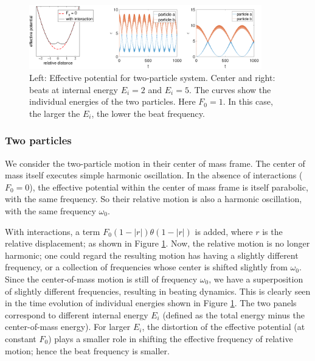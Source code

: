 \documentclass[aps,preprintnumbers,onecolumn,amsmath,amssymb,floatfix,pra]{revtex4-1}
\begin{document}
\begin{figure}[tbph]
\centering
\includegraphics[width=0.9\textwidth]{ZhiyuPictures/two_particles_a_01.pdf}
\caption{Left: Effective potential for two-particle system.  Center and right: beats at internal
  energy $E_i=2$ and $E_i=5$.  The curves show the individual energies of the two particles.  Here
  $F_0=1$. In this case, the larger the $E_i$, the lower the beat frequency. }
\label{fig:thermalization2}
\end{figure}


\subsubsection{Two particles}

We consider the two-particle motion in their center of mass frame.  The center of mass itself
executes simple harmonic oscillation.  In the absence of interactions ($F_0=0$), the effective
potential within the center of mass frame is itself parabolic, with the same frequency.  So their
relative motion is also a harmonic oscillation, with the same frequency $\omega_0$.

With interactions, a term $F_0(1-|r|)\theta(1-|r|)$ is added, where $r$ is the relative
displacement; as shown in Figure \ref{fig:thermalization2}.  Now, the relative motion is no longer
harmonic; one could regard the resulting motion has having a slightly different frequency, or a
collection of frequencies whose center is shifted slightly from $\omega_0$.  Since the
center-of-mass motion is still of frequency $\omega_0$, we have a superposition of slightly
different frequencies, resulting in beating dynamics.  This is clearly seen in the time evolution of
individual energies shown in Figure \ref{fig:thermalization2}.  The two panels correspond to
different internal energy $E_i$ (defined as the total energy minus the center-of-mass energy).  For
larger $E_i$, the distortion of the effective potential (at constant $F_0$) plays a smaller role in
shifting the effective frequency of relative motion; hence the beat frequency is smaller.  
\end{document}

